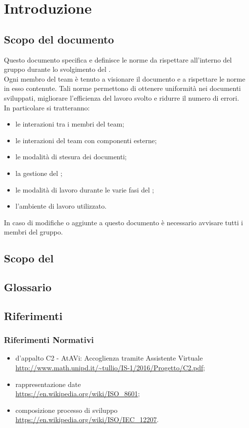 \section{Introduzione}
	\subsection{Scopo del documento}
	Questo documento specifica e definisce le norme da rispettare all'interno del gruppo \GRUPPO{} durante lo svolgimento del  \PROGETTO. \\
	Ogni membro del team è tenuto a visionare il documento e a rispettare le norme in esso contenute. Tali norme permettono di ottenere uniformità nei documenti sviluppati,
	migliorare l'efficienza del lavoro svolto e ridurre il numero di errori. \\
	In particolare si tratteranno:
	\begin{itemize}
		\item le interazioni tra i membri del team;
		\item le interazioni del team con componenti esterne;
		\item le modalità di stesura dei documenti;
		\item la gestione del ;
		\item le modalità di lavoro durante le varie fasi del ;
		\item l'ambiente di lavoro utilizzato.
	\end{itemize}
	In caso di modifiche o aggiunte a questo documento è necessario avvisare tutti i membri del gruppo.
	\subsection{Scopo del }
		\SCOPO
	\subsection{Glossario}
		\GLOSSARIO
	\subsection{Riferimenti}
		\subsubsection{Riferimenti Normativi}
		\begin{itemize}
		\item {} d'appalto C2 - AtAVi: Accoglienza tramite Assistente Virtuale \\
		\url{http://www.math.unipd.it/~tullio/IS-1/2016/Progetto/C2.pdf};
		\item rappresentazione date \\
		\url{https://en.wikipedia.org/wiki/ISO_8601};
		\item composizione processo di sviluppo \\
		\url{https://en.wikipedia.org/wiki/ISO/IEC_12207}.
\newpage
	\end{itemize}
